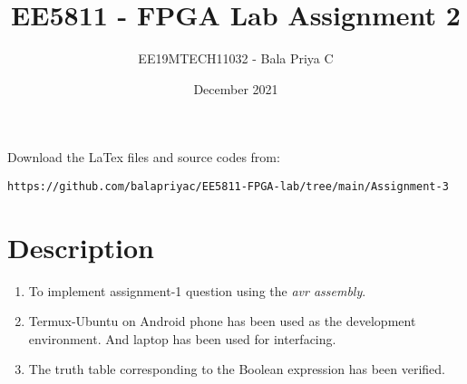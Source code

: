\documentclass[journal,12pt,twocolumn]{IEEEtran}
\title{EE5811 - FPGA Lab Assignment 2}
\author{EE19MTECH11032 - Bala Priya C}
\date{December 2021}
\numberwithin{equation}{section}
\begin{document}
\maketitle
Download the LaTex files and source codes from:
\begin{lstlisting}
https://github.com/balapriyac/EE5811-FPGA-lab/tree/main/Assignment-3
\end{lstlisting}




\maketitle

\section{Description}
\begin{enumerate}
    \item To implement assignment-1 question using the \textit{avr assembly}.
    \item Termux-Ubuntu on Android phone has been used as the development environment. And laptop has been used for interfacing.
    \item The truth table corresponding to the Boolean expression has been verified.
\end{enumerate}
\end{document}

